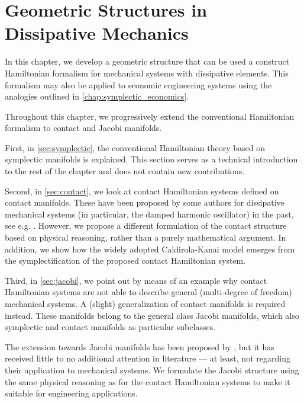\chapter{Geometric Structures in Dissipative Mechanics}
\label{chap:geometric_structures}

In this chapter, we develop a geometric structure that can be used a construct Hamiltonian formalism for mechanical systems with dissipative elements. This formalism may also be applied to economic engineering systems using the analogies outlined in \cref{chap:symplectic_economics}.

Throughout this chapter, we progressively extend the conventional Hamiltonian formalism to contact and Jacobi manifolds.

First, in \cref{sec:symplectic}, the conventional Hamiltonian theory based on symplectic manifolds is explained. This section serves as a technical introduction to the rest of the chapter and does not contain new contributions.

Second, in \cref{sec:contact}, we look at contact Hamiltonian systems defined on contact manifolds. These have been proposed by some authors for dissipative mechanical systems (in particular, the damped harmonic oscillator) in the past, see e.g. \citet{Bravetti2015}. However, we propose a different formulation of the contact structure based on physical reasoning, rather than a purely mathematical argument. In addition, we show how the widely adopted Caldirola-Kanai model emerges from the symplectification of the proposed contact Hamiltonian system.

Third, in \cref{sec:jacobi}, we point out by means of an example why contact Hamiltonian systems are not able to describe general (multi-degree of freedom) mechanical systems. A (slight) generalization of contact manifolds is required instead. These manifolds belong to the general class Jacobi manifolds, which also symplectic and contact manifolds as particular subclasses.

The extension towards Jacobi manifolds has been proposed by \citet{ciaglia2018}, but it has received little to no additional attention in literature --- at least, not regarding their application to mechanical systems. We formulate the Jacobi structure using the same physical reasoning as for the contact Hamiltonian systems to make it suitable for engineering applications.






